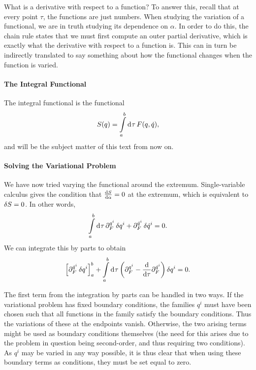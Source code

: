 What is a derivative with respect to a function? To answer this, recall that at every point $\tau$, the functions are just numbers. When studying the variation of a functional, we are in truth studying its dependence on $\alpha$. In order to do this, the chain rule states that we must first compute an outer partial derivative, which is exactly what the derivative with respect to a function is. This can in turn be indirectly translated to say something about how the functional changes when the function is varied.

\paragraph{The Integral Functional}
The integral functional is the functional
\begin{align*}
	S(q) = \int\limits_{a}^{b}\dd[]{\tau}F(q, \dot{q}),
\end{align*}
and will be the subject matter of this text from now on.

\paragraph{Solving the Variational Problem}
We have now tried varying the functional around the extremum. Single-variable calculus gives the condition that $\dv{S}{\alpha} = 0$ at the extremum, which is equivalent to $\var{S} = 0$. In other words,
\begin{align*}
	\int\limits_{a}^{b}\dd[]{\tau}\partial^{q^{i}}_{F}\var{q^{i}} + \partial^{\dot{q}^{i}}_{F}\var{\dot{q}^{i}} = 0.
\end{align*}
We can integrate this by parts to obtain
\begin{align*}
	\left[\partial^{\dot{q}^{i}}_{F}\var{q^{i}}\right]_{a}^{b} + \int\limits_{a}^{b}\dd[]{\tau}\left(\partial^{q^{i}}_{F} - \dv{\tau}\partial^{\dot{q}^{i}}_{F}\right)\var{q^{i}} = 0.
\end{align*}

The first term from the integration by parts can be handled in two ways. If the variational problem has fixed boundary conditions, the families $q^{i}$ must have been chosen such that all functions in the family satisfy the boundary conditions. Thus the variations of these at the endpoints vanish. Otherwise, the two arising terms might be used as boundary conditions themselves (the need for this arises due to the problem in question being second-order, and thus requiring two conditions). As $q^{i}$ may be varied in any way possible, it is thus clear that when using these boundary terms as conditions, they must be set equal to zero.

